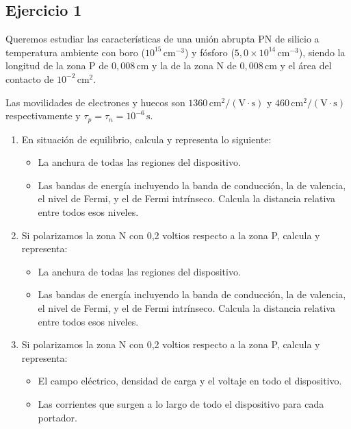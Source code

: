 \begin{Enunciado}
\subsection*{Ejercicio 1}

Queremos estudiar las características de una unión abrupta PN de silicio a temperatura ambiente con boro (\(10^{15} \, \text{cm}^{-3}\)) y fósforo (\(5,0 \times 10^{14} \, \text{cm}^{-3}\)), siendo la longitud de la zona P de \(0,008 \, \text{cm}\) y la de la zona N de \(0,008 \, \text{cm}\) y el área del contacto de \(10^{-2} \, \text{cm}^2\). 

Las movilidades de electrones y huecos son \(1360 \, \text{cm}^2/(\text{V}\cdot\text{s})\) y \(460 \, \text{cm}^2/(\text{V}\cdot\text{s})\) respectivamente y \(\tau_p = \tau_n = 10^{-6} \, \text{s}\).

\begin{enumerate}[label=\alph*)]
\item En situación de equilibrio, calcula y representa lo siguiente:
\begin{itemize}
    \item La anchura de todas las regiones del dispositivo.
    \item Las bandas de energía incluyendo la banda de conducción, la de valencia, el nivel de Fermi, y el de Fermi intrínseco. Calcula la distancia relativa entre todos esos niveles.
\end{itemize}

\item Si polarizamos la zona N con 0,2 voltios respecto a la zona P, calcula y representa:
\begin{itemize}
    \item La anchura de todas las regiones del dispositivo.
    \item Las bandas de energía incluyendo la banda de conducción, la de valencia, el nivel de Fermi, y el de Fermi intrínseco. Calcula la distancia relativa entre todos esos niveles.
\end{itemize}

\item Si polarizamos la zona N con 0,2 voltios respecto a la zona P, calcula y representa:
\begin{itemize}
    \item El campo eléctrico, densidad de carga y el voltaje en todo el dispositivo.
    \item Las corrientes que surgen a lo largo de todo el dispositivo para cada portador.
\end{itemize}
\end{enumerate}
\end{Enunciado}


